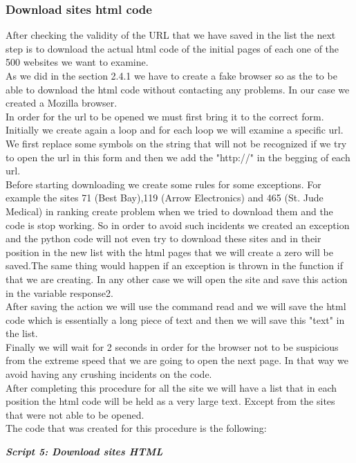 \documentclass{article}
\begin{document}
\subsubsection{Download sites html code}
After checking the validity of the URL that we have saved in the list the next step is to download the actual html code of the initial pages of each one of the 500 websites we want to examine.\\
As we did in the section 2.4.1 we have to create a fake browser so as the to be able to download the html code without contacting any problems. In our case we created a Mozilla browser.\\
In order for the url to be opened we must first bring it to the correct form. Initially we create again a loop and for each loop we will examine a specific url. We first replace some symbols on the string that will not be recognized if we try to open the url in this form and then we add the "http://" in the begging of each url.\\ 
Before starting downloading we create some rules for some exceptions. For example the sites 71 (Best Bay),119 (Arrow Electronics) and 465 (St. Jude Medical) in ranking create problem when we tried to download them and the code is stop working. So in order to avoid such incidents we created an exception and the python code will not even try to download these sites and in their position in the new list with the html pages that we will create a zero will be saved.The same thing would happen if an exception is thrown in the function if that we are creating. In any other case we will open the site and save this action in the variable response2.\\
After saving the action we will use the command read and we will save the html code which is essentially a long piece of text and then we will save this "text" in the list.\\
Finally we will wait for 2 seconds in order for the browser not to be suspicious from the extreme speed that we are going to open the next page. In that way we avoid having any crushing incidents on the code.\\
After completing this procedure for all the site we will have a list that in each position the html code will be held as a very large text. Except from the sites that were not able to be opened.\\
The code that was created for this procedure is the following:
\begin{center}
\textit{\textbf{Script 5: Download sites HTML}}
\end{center}
\end{document}
